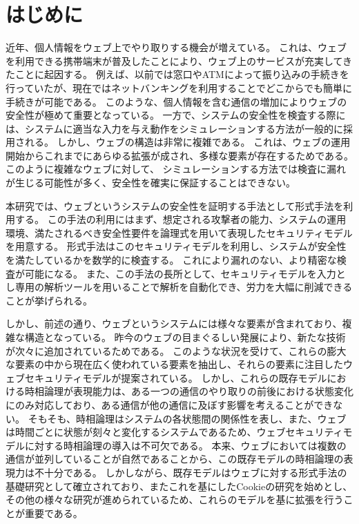 \documentclass[12pt,a4paper]{jbook}
\begin{document}
\newpage

\chapter{はじめに}
近年、個人情報をウェブ上でやり取りする機会が増えている。
これは、ウェブを利用できる携帯端末が普及したことにより、ウェブ上のサービスが充実してきたことに起因する。
例えば、以前では窓口やATMによって振り込みの手続きを行っていたが、現在ではネットバンキングを利用することでどこからでも簡単に手続きが可能である。
このような、個人情報を含む通信の増加によりウェブの安全性が極めて重要となっている。
一方で、システムの安全性を検査する際には、システムに適当な入力を与え動作をシミュレーションする方法が一般的に採用される。
しかし、ウェブの構造は非常に複雑である。
これは、ウェブの運用開始からこれまでにあらゆる拡張が成され、多様な要素が存在するためである。
このように複雑なウェブに対して、
シミュレーションする方法では検査に漏れが生じる可能性が多く、安全性を確実に保証することはできない。

本研究では、ウェブというシステムの安全性を証明する手法として形式手法を利用する。
この手法の利用にはまず、想定される攻撃者の能力、システムの運用環境、満たされるべき安全性要件を論理式を用いて表現したセキュリティモデルを用意する。
形式手法はこのセキュリティモデルを利用し、システムが安全性を満たしているかを数学的に検査する。
これにより漏れのない、より精密な検査が可能になる。
また、この手法の長所として、セキュリティモデルを入力とし専用の解析ツールを用いることで解析を自動化でき、労力を大幅に削減できることが挙げられる。

しかし、前述の通り、ウェブというシステムには様々な要素が含まれており、複雑な構造となっている。
昨今のウェブの目まぐるしい発展により、新たな技術が次々に追加されているためである。
このような状況を受けて、これらの膨大な要素の中から現在広く使われている要素を抽出し、それらの要素に注目したウェブセキュリティモデルが提案されている\cite{based-model,cookie-model}。
\color{red}
しかし、これらの既存モデルにおける時相論理が表現能力は、ある一つの通信のやり取りの前後における状態変化にのみ対応しており、ある通信が他の通信に及ぼす影響を考えることができない。
そもそも、時相論理はシステムの各状態間の関係性を表し、また、ウェブは時間ごとに状態が刻々と変化するシステムであるため、ウェブセキュリティモデルに対する時相論理の導入は不可欠である。
本来、ウェブにおいては複数の通信が並列していることが自然であることから、この既存モデルの時相論理の表現力は不十分である。
しかしながら、既存モデル\cite{based-model}はウェブに対する形式手法の基礎研究として確立されており、またこれを基にしたCookieの研究\cite{cookie-model}を始めとし、その他の様々な研究\cite{chaitanya2017formal, bagheri2016practical, chen2015aspire, nelson2013aluminum, somorovsky2011all}が進められているため、これらのモデルを基に拡張を行うことが重要である。
\end{document}
